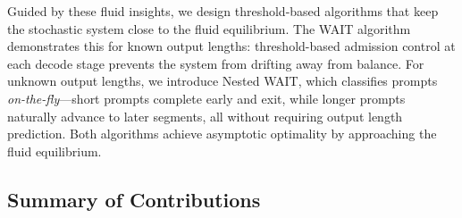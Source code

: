 Guided by these fluid insights, we design threshold-based algorithms that keep the stochastic system close to the fluid equilibrium. The WAIT algorithm demonstrates this for known output lengths: threshold-based admission control at each decode stage prevents the system from drifting away from balance. For unknown output lengths, we introduce Nested WAIT, which classifies prompts \emph{on-the-fly}---short prompts complete early and exit, while longer prompts naturally advance to later segments, all without requiring output length prediction. Both algorithms achieve asymptotic optimality by approaching the fluid equilibrium. 

\subsection{Summary of Contributions}

